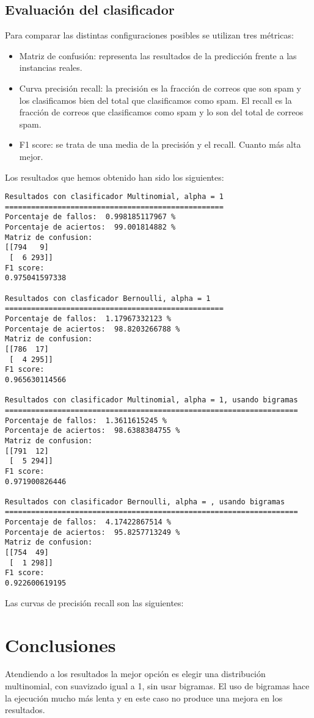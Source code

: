 \documentclass[12pt]{article}
\begin{document}
\subsection{Evaluaci\'on del clasificador}
Para comparar las distintas configuraciones posibles se utilizan tres
m\'etricas:
\begin{itemize}
	\item Matriz de confusi\'on: representa las resultados de la
	predicci\'on frente a las instancias reales. 

	\item Curva precisi\'on recall: la precisi\'on es la fracci\'on
	de correos que son spam y los clasificamos bien del total que
	clasificamos como spam.
	El recall es la fracci\'on de correos que clasificamos como spam y lo
	son del total de correos spam. 
	\item F1 score: se trata de una media de la precisi\'on y el recall.
	Cuanto m\'as alta mejor.
\end{itemize}
Los resultados que hemos obtenido han sido los siguientes:
\begin{verbatim}
Resultados con clasificador Multinomial, alpha = 1
==================================================
Porcentaje de fallos:  0.998185117967 %
Porcentaje de aciertos:  99.001814882 %
Matriz de confusion:
[[794   9]
 [  6 293]]
F1 score:
0.975041597338

Resultados con clasficador Bernoulli, alpha = 1
==================================================
Porcentaje de fallos:  1.17967332123 %
Porcentaje de aciertos:  98.8203266788 %
Matriz de confusion:
[[786  17]
 [  4 295]]
F1 score:
0.965630114566

Resultados con clasificador Multinomial, alpha = 1, usando bigramas
===================================================================
Porcentaje de fallos:  1.3611615245 %
Porcentaje de aciertos:  98.6388384755 %
Matriz de confusion:
[[791  12]
 [  5 294]]
F1 score:
0.971900826446

Resultados con clasificador Bernoulli, alpha = , usando bigramas
===================================================================
Porcentaje de fallos:  4.17422867514 %
Porcentaje de aciertos:  95.8257713249 %
Matriz de confusion:
[[754  49]
 [  1 298]]
F1 score:
0.922600619195
\end{verbatim}

Las curvas de precisi\'on recall son las siguientes:

\section{Conclusiones}
Atendiendo a los resultados la mejor opci\'on es elegir una distribuci\'on
multinomial, con suavizado igual a 1, sin usar bigramas. El uso de bigramas
hace la ejecuci\'on mucho m\'as lenta y en este caso no produce una mejora en
los resultados. 
\end{document}
